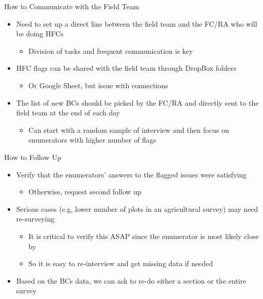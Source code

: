 \documentclass[aspectratio=169]{beamer}
\begin{document}
\begin{frame}{How to Communicate with the Field Team}
    
    \begin{itemize}
    \setlength\itemsep{2em}
        
        \vspace{1em}
        \item Need to set up a direct line between the field team and the FC/RA who will be doing HFCs
        \begin{itemize}
            \item Division of tasks and frequent communication is key
        \end{itemize}
        \item HFC flags can be shared with the field team through DropBox folders
        \begin{itemize}
            \item Or Google Sheet, but issue with connections
        \end{itemize}
        \item The list of new BCs should be picked by the FC/RA and directly sent to the field team at the end of each day
        \begin{itemize}
            \item Can start with a random sample of interview and then focus on enumerators with higher number of flags
        \end{itemize}
        
    \end{itemize}
    
\end{frame}

\begin{frame}{How to Follow Up}

\begin{itemize}
    \setlength\itemsep{1.5em}
    \item Verify that the enumerators' answers to the flagged issues were satisfying
        \begin{itemize}
            \item Otherwise, request second follow up
        \end{itemize}
    
    \item Serious cases (e.g, lower number of plots in an agricultural survey) may need re-surveying
        \begin{itemize}
            \item It is critical to verify this ASAP since the enumerator is most likely close by
            \item So it is easy to re-interview and get missing data if needed
        \end{itemize}
        
    \item Based on the BCs data, we can ask to re-do either a section or the entire survey
    
\end{itemize}

\end{frame}
\end{document}
